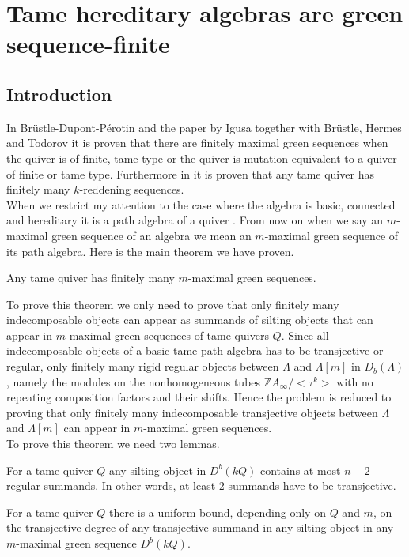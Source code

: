 \chapter{Tame hereditary algebras are green sequence-finite}\label{C2}
\section{Introduction}
 In Br\"ustle-Dupont-P\'erotin \cite{BDP13} and the paper by Igusa together with Br\"ustle, Hermes and Todorov \cite{BHIT15} it is proven that there are finitely maximal green sequences when the quiver is of finite, tame type or the quiver is mutation equivalent to a quiver of finite or tame type. Furthermore in \cite{BHIT15} it is proven that any tame quiver has finitely many $k$-reddening sequences.\\
\indent When we restrict my attention to the case where the algebra is basic, connected and hereditary it is a path algebra of a quiver \cite{ASS06}. From now on when we say an $m$-maximal green sequence of an algebra we mean an $m$-maximal green sequence of its path algebra. Here is the main theorem we have proven.\\
\begin{theorem}
Any tame quiver has finitely many $m$-maximal green sequences.\label{C3T}
\end{theorem}
\indent To prove this theorem we only need to prove that only finitely many indecomposable objects can appear as summands of silting objects that can appear in $m$-maximal green sequences of tame quivers $Q$. Since all indecomposable objects of a basic tame path algebra has to be transjective or regular, only finitely many rigid regular objects between $\Lambda$ and $\Lambda[m]$ in $D_b(\Lambda)$, namely the modules on the nonhomogeneous tubes $\mathbb{Z}A_\infty/<\tau^k>$ with no repeating composition factors and their shifts. Hence the problem is reduced to proving that only finitely many indecomposable transjective objects between $\Lambda$ and $\Lambda[m]$ can appear in $m$-maximal green sequences.\\
\indent To prove this theorem we need two lemmas.\\
\begin{lemma}\label{def:C3L1}
For a tame quiver $Q$ any silting object in $D^b(kQ)$ contains at most $n-2$ regular summands. In other words, at least 2 summands have to be transjective. 
\end{lemma}
\begin{lemma}\label{def:C3L2}
For a tame quiver $Q$ there is a uniform bound, depending only on $Q$ and $m$, on the transjective degree of any transjective summand in any silting object in any $m$-maximal green sequence $D^b(kQ)$.
\end{lemma}
